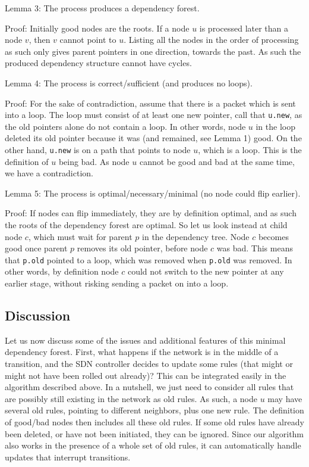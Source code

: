 Lemma 3: The process produces a dependency forest.

Proof: Initially good nodes are the roots. If a node $u$ is processed later than a node $v$, then $v$ cannot point to $u$. Listing all the nodes in the order of processing as such only gives parent pointers in one direction, towards the past. As such the produced dependency structure cannot have cycles.

Lemma 4: The process is correct/sufficient (and produces no loops).

Proof: For the sake of contradiction, assume that there is a packet which is sent into a loop. The loop must consist of at least one new pointer, call that \texttt{u.new}, as the old pointers alone do not contain a loop. In other words, node $u$ in the loop deleted its old pointer because it was (and remained, see Lemma 1) good. On the other hand, \texttt{u.new} is on a path that points to node $u$, which is a loop. This is the definition of $u$ being bad. As node $u$ cannot be good and bad at the same time, we have a contradiction.

Lemma 5: The process is optimal/necessary/minimal (no node could flip earlier).

Proof: If nodes can flip immediately, they are by definition optimal, and as such the roots of the dependency forest are optimal. So let us look instead at child node $c$, which must wait for parent $p$ in the dependency tree. Node $c$ becomes good once parent $p$ removes its old pointer, before node $c$ was bad. This means that \texttt{p.old} pointed to a loop, which was removed when \texttt{p.old} was removed. In other words, by definition node $c$ could not switch to the new pointer at any earlier stage, without risking sending a packet on into a loop.

\subsection{Discussion} %

Let us now discuss some of the issues and additional features of this minimal dependency forest. First, what happens if the network is in the middle of a transition, and the SDN controller decides to update some rules (that might or might not have been rolled out already)? This can be integrated easily in the algorithm described above. In a nutshell, we just need to consider all rules that are possibly still existing in the network as old rules. As such, a node $u$ may have several old rules, pointing to different neighbors, plus one new rule. The definition of good/bad nodes then includes all these old rules. If some old rules have already been deleted, or have not been initiated, they can be ignored. Since our algorithm also works in the presence of a whole set of old rules, it can automatically handle updates that interrupt transitions.

